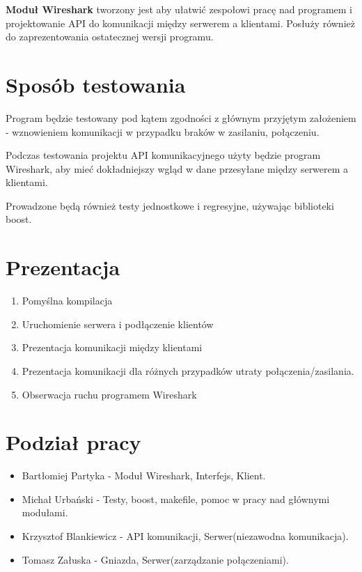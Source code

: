 \documentclass{article}
\begin{document}
\textbf{Moduł Wireshark} tworzony jest aby ułatwić zespołowi pracę nad programem i projektowanie API do komunikacji między serwerem a klientami. Posłuży również do zaprezentowania ostatecznej wersji programu.


\section{Sposób testowania\label{test}}

Program będzie testowany pod kątem zgodności z głównym przyjętym założeniem - wznowieniem komunikacji w przypadku braków w zasilaniu, połączeniu.


Podczas testowania projektu API komunikacyjnego użyty będzie program Wireshark, aby mieć dokładniejszy wgląd w dane przesyłane między serwerem a klientami.

Prowadzone będą również testy jednostkowe i regresyjne, używając biblioteki boost.


\section{Prezentacja\label{prez}}

\begin{enumerate}
    \item Pomyślna kompilacja
    \item Uruchomienie serwera i podłączenie klientów
    \item Prezentacja komunikacji między klientami
    \item Prezentacja komunikacji dla różnych przypadków utraty połączenia/zasilania.
    \item Obserwacja ruchu programem Wireshark
\end{enumerate}
    

\section{Podział pracy\label{prac}}
\begin{itemize}
\item Bartłomiej Partyka - Moduł Wireshark, Interfejs, Klient.

\item Michał Urbański - Testy, boost, makefile, pomoc w pracy nad głównymi modułami.

\item Krzysztof Blankiewicz - API komunikacji, Serwer(niezawodna komunikacja).

\item Tomasz Załuska - Gniazda, Serwer(zarządzanie połączeniami). 
\end{itemize}
\end{document}
